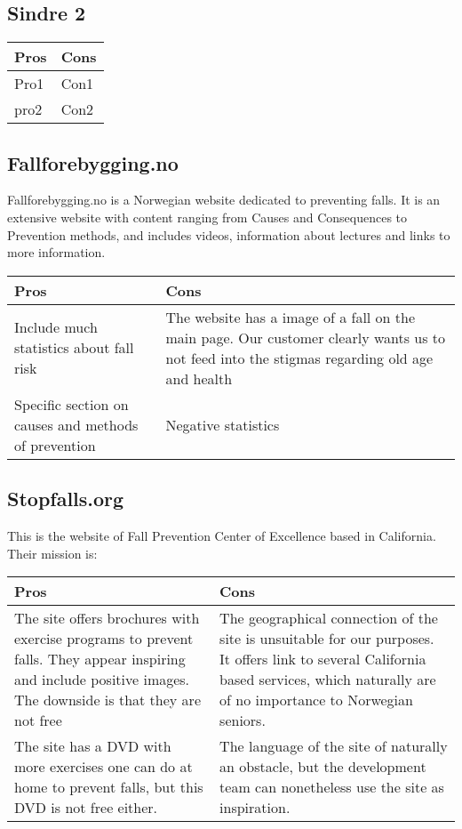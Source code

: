 \subsection{Sindre 2}
\begin{center}
\begin{tabu} to 0.8\textwidth{ |X[l]|X[l]| } 
\hline {}
Pros & Cons \\
\hline
Pro1 & 
Con1 \\ 
\hline
pro2 & Con2 \\ 
\hline

\end{tabu}
\end{center}

\subsection{Fallforebygging.no}
Fallforebygging.no \cite{fallforebygging} is a Norwegian website dedicated to preventing falls. It is an extensive website with content ranging from Causes and Consequences to  Prevention methods, and includes videos, information about lectures and links to more information. 
\begin{center}
\begin{tabu} to 0.8\textwidth{ |X[l]|X[l]| } 
\hline {}
Pros & Cons \\
\hline
Include much statistics about fall risk & 
The website has a image of a fall on the main page. Our customer clearly wants us to not feed into the stigmas regarding old age and health \\ 
\hline
Specific section on causes and methods of prevention & Negative statistics \\ 
\hline
\end{tabu}
\end{center}

\subsection{Stopfalls.org}
This is the website of Fall Prevention Center of Excellence based in California. Their mission is: 
\begin{center}
\begin{tabu} to 0.8\textwidth{ |X[l]|X[l]| } 
\hline {}
Pros & Cons \\
\hline
The site offers brochures with exercise programs to prevent falls. They appear inspiring and include positive images. The downside is that they are not free & 
The geographical connection of the site is unsuitable for our purposes. It offers link to several California based services, which naturally are of no importance to Norwegian seniors.  \\ 
\hline
The site has a DVD with more exercises one can do at home to prevent falls, but this DVD is not free either.
 & The language of the site of naturally an obstacle, but the development team can nonetheless  use the site as inspiration. \\ 
\hline
\end{tabu}
\end{center}

